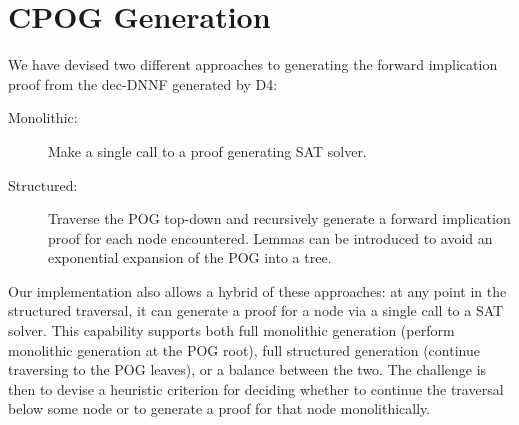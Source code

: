 \documentclass[twoside,11pt]{article}
\begin{document}
\section*{CPOG Generation}

We have devised two different approaches to generating the forward implication proof from the dec-DNNF generated by {\sc D4}:
\begin{description}
\item[Monolithic:] Make a single call to a proof generating SAT solver.
\item[Structured:] Traverse the POG top-down and recursively generate a forward implication proof for each node encountered.  Lemmas can be introduced to avoid an exponential expansion of the POG into a tree.
\end{description}

Our implementation also allows a hybrid of these approaches: at any
point in the structured traversal, it can generate a proof for a node via a
single call to a SAT solver.  This capability supports both full
monolithic generation (perform monolithic generation at the POG root),
full structured generation (continue traversing to the POG leaves), or
a balance between the two.
The challenge is then to devise a
heuristic criterion for deciding whether to continue the traversal below
some node or to generate a proof for that node monolithically.
\end{document}
